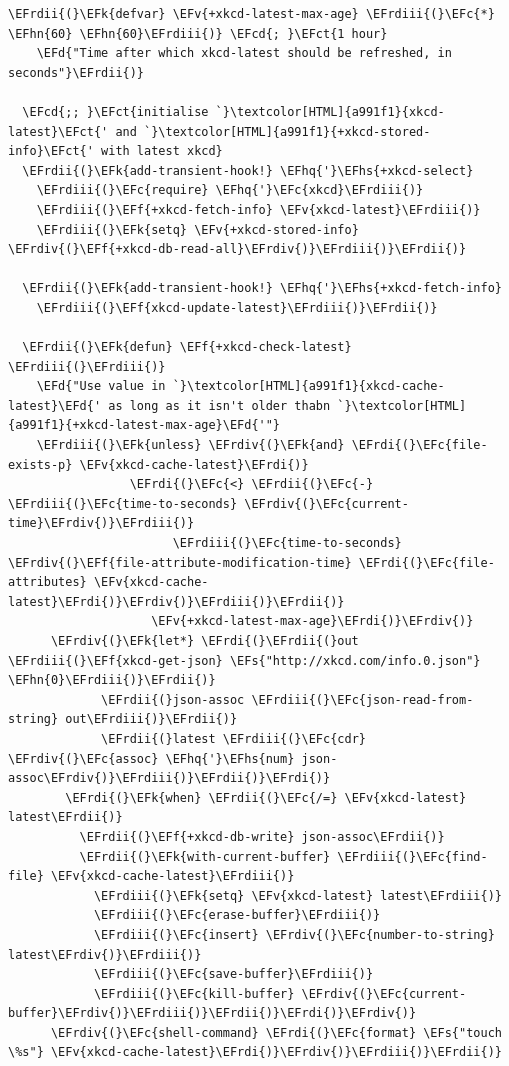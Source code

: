 \documentclass{scrartcl}
\newcommand{\EFk}[1]{\textcolor{EFk}{#1}} %
\newcommand{\EFd}[1]{\textcolor{EFd}{#1}} %
\newcommand{\EFs}[1]{\textcolor{EFs}{#1}} %
\newcommand{\EFct}[1]{\textcolor{EFct}{#1}} %
\newcommand{\EFc}[1]{\textcolor{EFc}{#1}} %
\newcommand{\EFv}[1]{\textcolor{EFv}{#1}} %
\newcommand{\EFf}[1]{\textcolor{EFf}{#1}} %
\newcommand{\EFcd}[1]{\textcolor{EFcd}{#1}} %
\newcommand{\EFhn}[1]{#1} %
\newcommand{\EFhq}[1]{#1} %
\newcommand{\EFhs}[1]{#1} %
\newcommand{\EFrdi}[1]{#1} %
\newcommand{\EFrdii}[1]{#1} %
\newcommand{\EFrdiii}[1]{#1} %
\newcommand{\EFrdiv}[1]{#1} %
\begin{document}
\begin{Code}
\begin{Verbatim}[]
  \EFrdii{(}\EFk{defvar} \EFv{+xkcd-latest-max-age} \EFrdiii{(}\EFc{*} \EFhn{60} \EFhn{60}\EFrdiii{)} \EFcd{; }\EFct{1 hour}
    \EFd{"Time after which xkcd-latest should be refreshed, in seconds"}\EFrdii{)}

  \EFcd{;; }\EFct{initialise `}\textcolor[HTML]{a991f1}{xkcd-latest}\EFct{' and `}\textcolor[HTML]{a991f1}{+xkcd-stored-info}\EFct{' with latest xkcd}
  \EFrdii{(}\EFk{add-transient-hook!} \EFhq{'}\EFhs{+xkcd-select}
    \EFrdiii{(}\EFc{require} \EFhq{'}\EFc{xkcd}\EFrdiii{)}
    \EFrdiii{(}\EFf{+xkcd-fetch-info} \EFv{xkcd-latest}\EFrdiii{)}
    \EFrdiii{(}\EFk{setq} \EFv{+xkcd-stored-info} \EFrdiv{(}\EFf{+xkcd-db-read-all}\EFrdiv{)}\EFrdiii{)}\EFrdii{)}

  \EFrdii{(}\EFk{add-transient-hook!} \EFhq{'}\EFhs{+xkcd-fetch-info}
    \EFrdiii{(}\EFf{xkcd-update-latest}\EFrdiii{)}\EFrdii{)}

  \EFrdii{(}\EFk{defun} \EFf{+xkcd-check-latest} \EFrdiii{(}\EFrdiii{)}
    \EFd{"Use value in `}\textcolor[HTML]{a991f1}{xkcd-cache-latest}\EFd{' as long as it isn't older thabn `}\textcolor[HTML]{a991f1}{+xkcd-latest-max-age}\EFd{'"}
    \EFrdiii{(}\EFk{unless} \EFrdiv{(}\EFk{and} \EFrdi{(}\EFc{file-exists-p} \EFv{xkcd-cache-latest}\EFrdi{)}
                 \EFrdi{(}\EFc{<} \EFrdii{(}\EFc{-} \EFrdiii{(}\EFc{time-to-seconds} \EFrdiv{(}\EFc{current-time}\EFrdiv{)}\EFrdiii{)}
                       \EFrdiii{(}\EFc{time-to-seconds} \EFrdiv{(}\EFf{file-attribute-modification-time} \EFrdi{(}\EFc{file-attributes} \EFv{xkcd-cache-latest}\EFrdi{)}\EFrdiv{)}\EFrdiii{)}\EFrdii{)}
                    \EFv{+xkcd-latest-max-age}\EFrdi{)}\EFrdiv{)}
      \EFrdiv{(}\EFk{let*} \EFrdi{(}\EFrdii{(}out \EFrdiii{(}\EFf{xkcd-get-json} \EFs{"http://xkcd.com/info.0.json"} \EFhn{0}\EFrdiii{)}\EFrdii{)}
             \EFrdii{(}json-assoc \EFrdiii{(}\EFc{json-read-from-string} out\EFrdiii{)}\EFrdii{)}
             \EFrdii{(}latest \EFrdiii{(}\EFc{cdr} \EFrdiv{(}\EFc{assoc} \EFhq{'}\EFhs{num} json-assoc\EFrdiv{)}\EFrdiii{)}\EFrdii{)}\EFrdi{)}
        \EFrdi{(}\EFk{when} \EFrdii{(}\EFc{/=} \EFv{xkcd-latest} latest\EFrdii{)}
          \EFrdii{(}\EFf{+xkcd-db-write} json-assoc\EFrdii{)}
          \EFrdii{(}\EFk{with-current-buffer} \EFrdiii{(}\EFc{find-file} \EFv{xkcd-cache-latest}\EFrdiii{)}
            \EFrdiii{(}\EFk{setq} \EFv{xkcd-latest} latest\EFrdiii{)}
            \EFrdiii{(}\EFc{erase-buffer}\EFrdiii{)}
            \EFrdiii{(}\EFc{insert} \EFrdiv{(}\EFc{number-to-string} latest\EFrdiv{)}\EFrdiii{)}
            \EFrdiii{(}\EFc{save-buffer}\EFrdiii{)}
            \EFrdiii{(}\EFc{kill-buffer} \EFrdiv{(}\EFc{current-buffer}\EFrdiv{)}\EFrdiii{)}\EFrdii{)}\EFrdi{)}\EFrdiv{)}
      \EFrdiv{(}\EFc{shell-command} \EFrdi{(}\EFc{format} \EFs{"touch \%s"} \EFv{xkcd-cache-latest}\EFrdi{)}\EFrdiv{)}\EFrdiii{)}\EFrdii{)}


\end{Verbatim}
\end{Code}
\end{document}
